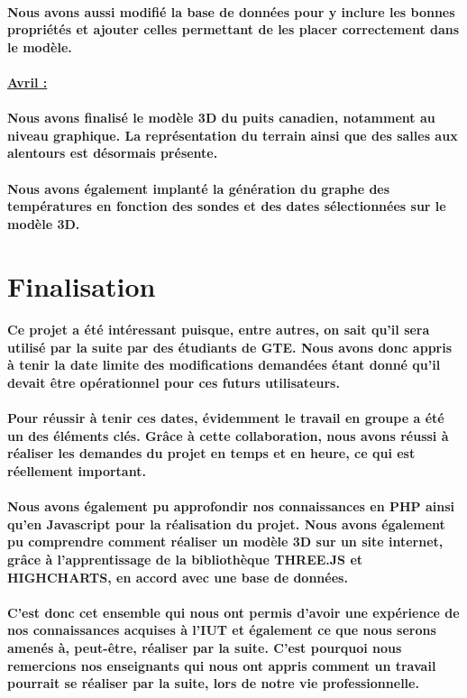 \documentclass[12pt , a4paper,titlepage]{report}
\begin{document}
 \paragraph{ Nous avons aussi modifié la base de données pour y inclure les bonnes propriétés et ajouter celles permettant de les placer
 correctement dans le modèle.}
 
 \paragraph{\underline {Avril :}}
 \paragraph{   Nous avons finalisé le modèle 3D du puits canadien, notamment au niveau graphique. La représentation du terrain ainsi que
 des salles aux alentours est désormais présente.}
 \paragraph{ Nous avons également implanté la génération du graphe des températures en fonction des sondes et des dates sélectionnées 
 sur le modèle 3D.}

 \section{Finalisation}
\paragraph{ Ce projet a été intéressant puisque, entre autres, on sait qu'il sera utilisé par la suite par des étudiants de GTE. Nous 
avons donc appris à tenir la date limite des modifications demandées étant donné qu'il devait être opérationnel pour ces futurs 
utilisateurs. }
\paragraph{Pour réussir à tenir ces dates, évidemment le travail en groupe a été un des éléments clés. Grâce à cette collaboration, nous
avons réussi à réaliser les demandes du projet en temps et en heure, ce qui est réellement important.}
\paragraph{ Nous avons également pu approfondir nos connaissances en PHP ainsi qu'en Javascript pour la réalisation du projet. Nous avons
également pu comprendre comment réaliser un modèle 3D sur un site internet, grâce à l'apprentissage de la bibliothèque THREE.JS et 
HIGHCHARTS, en accord avec une base de données.}   
\paragraph{ C'est donc cet ensemble qui nous ont permis d'avoir une expérience de nos connaissances acquises à l'IUT et également ce que
nous serons amenés à, peut-être, réaliser par la suite. C'est pourquoi nous remercions nos enseignants qui nous ont appris comment un
travail pourrait se réaliser par la suite, lors de notre vie professionnelle.}
\end{document}
